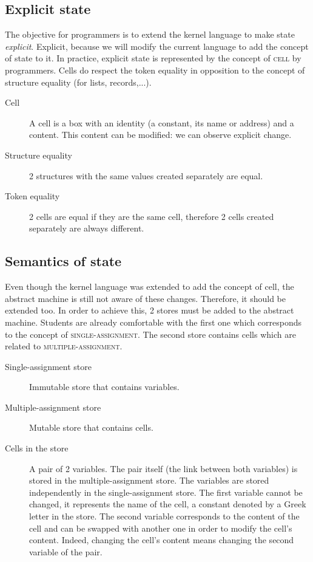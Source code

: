 \documentclass[11pt,a4paper,twoside,openright]{report}
\begin{document}
\subsection{Explicit state}

The objective for programmers is to extend the kernel language to make state 
\textit{explicit}. Explicit, because we will modify the current language to add 
the concept of state to it. In practice, explicit state is represented by the 
concept of \textsc{cell} by programmers. Cells do respect the token equality in 
opposition to the concept of structure equality (for lists, records,...).

\begin{description}
 \item[Cell] A cell is a box with an identity (a constant, its name or address) 
and a content. This content can be modified: we can observe explicit change.
 \item[Structure equality] 2 structures with the same values created separately 
are equal.
 \item[Token equality] 2 cells are equal if they are the same cell, therefore 2 
cells created separately are always different.
\end{description}

\subsection{Semantics of state}
Even though the kernel language was extended to add the concept of cell, the 
abstract machine is still not aware of these changes. Therefore, it should be 
extended too. In order to achieve this, 2 stores must be added to the abstract 
machine. Students are already comfortable with the first one which corresponds 
to the concept of \textsc{single-assignment}. The second store contains cells 
which are related to \textsc{multiple-assignment}.

\begin{description}
 \item[Single-assignment store] Immutable store that contains variables.
 \item[Multiple-assignment store] Mutable store that contains cells.
 \item[Cells in the store] A pair of 2 variables. The pair itself (the link 
between both variables) is stored in the multiple-assignment store. The 
variables are stored independently in the single-assignment store. The first 
variable cannot be changed, it represents the name of the cell, a constant 
denoted by a Greek letter in the store. The second variable corresponds to the 
content of the cell and can be swapped with another one in order to modify the 
cell's content. Indeed, changing the cell's content means changing the second 
variable of the pair. 
\end{description}
\end{document}
